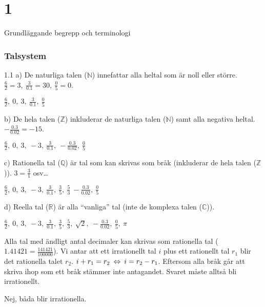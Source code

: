 \chapter{1}{Grundläggande begrepp och terminologi}
\subsection*{Talsystem}

\begin{task}{1.1 a)}
	De naturliga talen ($\mathbb{N}$) innefattar alla heltal som är noll eller större. $\tfrac{6}{2}=3,~\tfrac{3}{0.1}=30,~\tfrac{0}{5}=0$.
	
	\ans $\frac{6}{2},~0,~3,~\frac{3}{0.1},~\frac{0}{5}$
\end{task}

\begin{task}{b)}
	De hela talen ($\mathbb{Z}$) inkluderar de naturliga talen ($\mathbb{N}$) samt alla negativa heltal. $-\frac{0.3}{0.02}=-15$.

	\ans $\frac{6}{2},~0,~3,~-3,~\frac{3}{0.1},~-\frac{0.3}{0.02},~\frac{0}{5}$
\end{task}

\begin{task}{c)}
	Rationella tal ($\mathbb{Q}$) är tal som kan skrivas som bråk (inkluderar de hela talen ($\mathbb{Z}$)). $3=\frac{3}{1}$ osv\ldots
	
	\ans $\frac{6}{2},~0,~3,~-3,~\frac{3}{0.1},~\frac{3}{5},~\frac{5}{3}~-\frac{0.3}{0.02},~\frac{0}{5}$
\end{task}

\begin{task}{d)}
	Reella tal ($\mathbb{R}$) är alla ``vanliga'' tal (inte de komplexa talen ($\mathbb{C}$)).
	
	\ans $\frac{6}{2},~0,~3,~-3,~\frac{3}{0.1},~\frac{3}{5},~\frac{5}{3},~\sqrt{2},~-\frac{0.3}{0.02},~\frac{0}{5},~\pi$
\end{task}

\begin{task}{1.2}
	Alla tal med ändligt antal decimaler kan skrivas som rationella tal ($1.41421=\frac{141421}{100000}$). Vi antar att ett irrationellt tal $i$ plus ett rationellt tal $r_1$ blir det rationella talet $r_2$. $i+r_1=r_2 \lra i=r_2-r_1$. Eftersom alla bråk går att skriva ihop som ett bråk stämmer inte antagandet. Svaret måste alltså bli irrationellt.
	
	\ans Nej, båda blir irrationella.
\end{task}

